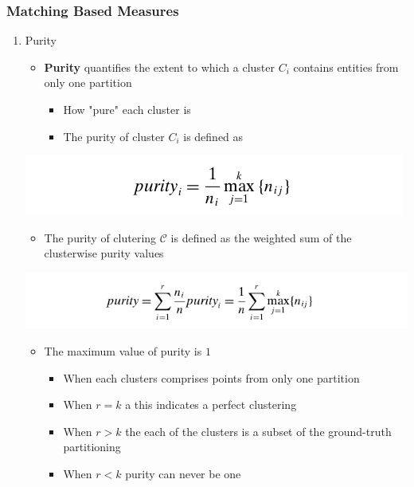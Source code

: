 \documentclass[11pt]{article}
\begin{document}
\subsubsection{Matching Based Measures}
\label{sec:orgfef6d75}
\begin{enumerate}
\item Purity
\label{sec:orgfe124ac}
\begin{itemize}
\item \textbf{Purity} quantifies the extent to which a cluster \(C_i\) contains entities from only one partition
\begin{itemize}
\item How "pure" each cluster is
\item The purity of cluster \(C_i\) is defined as
\end{itemize}
\end{itemize}
\begin{center}
\includegraphics[width=.9\linewidth]{Clustering Validation/screenshot_2018-11-27_22-42-06.png}
\end{center}

\begin{itemize}
\item The purity of clutering \(\mathcal C\) is defined as the weighted sum of the clusterwise purity values
\end{itemize}
\begin{center}
\includegraphics[width=.9\linewidth]{Clustering Validation/screenshot_2018-11-27_22-43-11.png}
\end{center}

\begin{itemize}
\item The maximum value of purity is \(1\)
\begin{itemize}
\item When each clusters comprises points from only one partition
\item When \(r=k\) a this indicates a perfect clustering
\item When \(r>k\) the each of the clusters is a subset of the ground-truth partitioning
\item When \(r < k\) purity can never be one
\end{itemize}
\end{itemize}


\end{enumerate}
\end{document}
